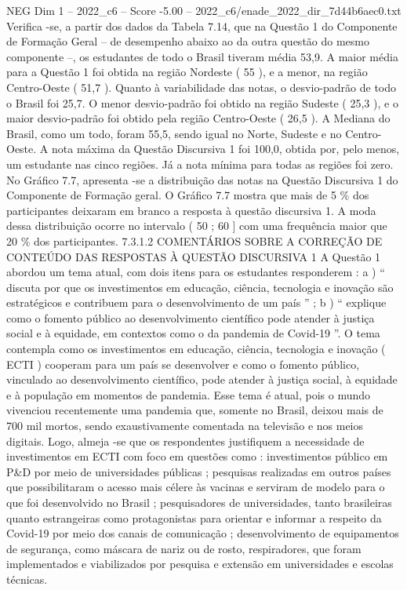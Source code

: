 \begin{textsample}{NEG Dim 1 – 2022\_c6 – Score -5.00 – 2022\_c6/enade\_2022\_dir\_7d44b6aec0.txt}
Verifica -se, a partir dos dados da Tabela 7.14, que na Questão 1 do Componente de Formação Geral – de desempenho abaixo ao da outra questão do mesmo componente –, os estudantes de todo o Brasil tiveram média 53,9.
A maior média para a Questão 1 foi obtida na região Nordeste ( 55 ), e a menor, na região Centro-Oeste ( 51,7 ).
Quanto à variabilidade das notas, o desvio-padrão de todo o Brasil foi 25,7.
O menor desvio-padrão foi obtido na região Sudeste ( 25,3 ), e o maior desvio-padrão foi obtido pela região Centro-Oeste ( 26,5 ).
A Mediana do Brasil, como um todo, foram 55,5, sendo igual no Norte, Sudeste e no Centro-Oeste.
A nota máxima da Questão Discursiva 1 foi 100,0, obtida por, pelo menos, um estudante nas cinco regiões.
Já a nota mínima para todas as regiões foi zero.
No Gráfico 7.7, apresenta -se a distribuição das notas na Questão Discursiva 1 do Componente de Formação geral.
O Gráfico 7.7 mostra que mais de 5 \% dos participantes deixaram em branco a resposta à questão discursiva 1.
A moda dessa distribuição ocorre no intervalo ( 50 ; 60 ] com uma frequência maior que 20 \% dos participantes. 7.3.1.2 COMENTÁRIOS SOBRE A CORREÇÃO DE CONTEÚDO DAS RESPOSTAS À QUESTÃO DISCURSIVA 1 A Questão 1 abordou um tema atual, com dois itens para os estudantes responderem : a ) “ discuta por que os investimentos em educação, ciência, tecnologia e inovação são estratégicos e contribuem para o desenvolvimento de um país ” ; b ) “ explique como o fomento público ao desenvolvimento científico pode atender à justiça social e à equidade, em contextos como o da pandemia de Covid-19 ”.
O tema contempla como os investimentos em educação, ciência, tecnologia e inovação ( ECTI ) cooperam para um país se desenvolver e como o fomento público, vinculado ao desenvolvimento científico, pode atender à justiça social, à equidade e à população em momentos de pandemia.
Esse tema é atual, pois o mundo vivenciou recentemente uma pandemia que, somente no Brasil, deixou mais de 700 mil mortos, sendo exaustivamente comentada na televisão e nos meios digitais.
Logo, almeja -se que os respondentes justifiquem a necessidade de investimentos em ECTI com foco em questões como : investimentos público em P\&D por meio de universidades públicas ; pesquisas realizadas em outros países que possibilitaram o acesso mais célere às vacinas e serviram de modelo para o que foi desenvolvido no Brasil ; pesquisadores de universidades, tanto brasileiras quanto estrangeiras como protagonistas para orientar e informar a respeito da Covid-19 por meio dos canais de comunicação ; desenvolvimento de equipamentos de segurança, como máscara de nariz ou de rosto, respiradores, que foram implementados e viabilizados por pesquisa e extensão em universidades e escolas técnicas.

\end{textsample}
